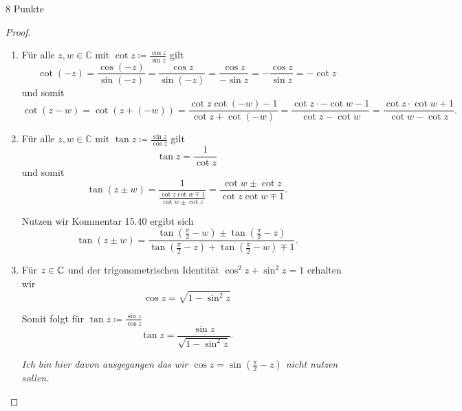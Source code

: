 \documentclass{problemset}
\begin{document}
\begin{problem}{8 Punkte}
\begin{proof}
\begin{enumerate}
        \item Für alle $z, w \in \mathbb{C}$ mit $\cot z \coloneqq \frac{\cos
              z}{\sin z}$ gilt
              \[
                  \cot (-z) = \frac{\cos (-z)}{\sin (-z)} = \frac{\cos z}{\sin (-z)} = \frac{\cos z}{ - \sin z} = - \frac{\cos z}{ \sin z} = - \cot z
              \]
              und somit
              \[
                  \cot(z - w) = \cot(z + (-w)) = \frac{\cot z \cot (-w) - 1}{\cot z + \cot (-w)} = \frac{\cot z \cdot -\cot w - 1}{\cot z - \cot w} = \frac{\cot z \cdot \cot w + 1}{\cot w  - \cot z}.
              \]

        \item Für alle $z, w \in \mathbb{C}$ mit $\tan z \coloneqq \frac{\sin
              z}{\cos z}$ gilt
              \[
                  \tan z = \frac{1}{\cot z}
              \] und somit
              \[
                  \tan (z \pm w) = \frac{1}{\frac{\cot z \cot w \mp 1}{\cot w \pm \cot z }} = \frac{\cot w \pm \cot z }{\cot z \cot w \mp 1}.
              \]

              Nutzen wir Kommentar 15.40  ergibt sich
              \[
                  \tan (z \pm w) = \frac{ \tan (\frac{\pi}{2} - w) \pm \tan (\frac{\pi}{2} - z)}{\tan (\frac{\pi}{2} - z) + \tan (\frac{\pi}{2} - w) \mp 1}.
              \]

        \item Für $z \in \mathbb{C}$ und der trigonometrischen Identität $\cos^2
              z + \sin^2 z = 1$ erhalten wir \[
                  \cos z = \sqrt{ 1 - \sin^2 z }
              \]

              Somit folgt für $\tan z \coloneqq \frac{\sin z}{\cos z}$ \[
                  \tan z = \frac{\sin z}{\sqrt{1 - \sin^2 z}}.
              \]

              \textit{Ich bin hier davon ausgegangen das wir $\cos z = \sin (\frac{\pi}{2} - z)$ nicht nutzen sollen.}
    \end{enumerate}

\end{proof}

\end{problem}
\end{document}
